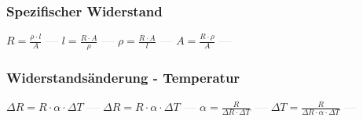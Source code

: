 \subsubsection{Spezifischer Widerstand} 
\begin{minipage}{0.45\textwidth} 
\end{minipage} 
\begin{minipage}{0.45\textwidth} 
 
\end{minipage} 
$ R = \frac{\rho \cdot l}{ A} $ \textcolor{lightgray}{\textbf{---}} 
$ l = \frac{R\cdot A}{ \rho } $ \textcolor{lightgray}{\textbf{---}} 
$ \rho  = \frac{R\cdot A}{ l} $ \textcolor{lightgray}{\textbf{---}} 
$ A = \frac{R\cdot \rho }{ A} $ \textcolor{lightgray}{\textbf{---}} 

\subsubsection{Widerstandsänderung - Temperatur} 
\begin{minipage}{0.45\textwidth} 
\end{minipage} 
\begin{minipage}{0.45\textwidth} 
 
\end{minipage} 
$ \Delta R = R\cdot \alpha \cdot \Delta T $ \textcolor{lightgray}{\textbf{---}} 
$ \Delta R = R\cdot \alpha \cdot \Delta T $ \textcolor{lightgray}{\textbf{---}} 
$ \alpha  = \frac{R}{\Delta R\cdot \Delta T} $ \textcolor{lightgray}{\textbf{---}} 
$ \Delta T = \frac{   R}{\Delta R\cdot \alpha \cdot \Delta T} $ \textcolor{lightgray}{\textbf{---}} 

